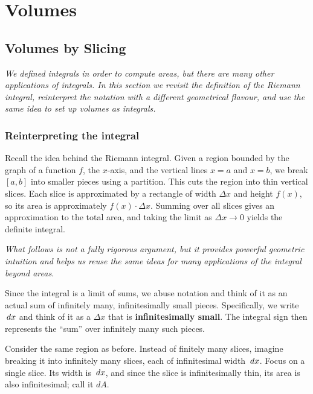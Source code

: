\chapter{Volumes}

\section{Volumes by Slicing}
\label{sec:10.1}

\textit{We defined integrals in order to compute areas, but there are many other applications of integrals.  In this section we revisit the definition of the Riemann integral, reinterpret the notation with a different geometrical flavour, and use the same idea to set up volumes as integrals.}

\subsection*{Reinterpreting the integral}

Recall the idea behind the Riemann integral.  Given a region bounded by the graph of a function $f$, the $x$-axis, and the vertical lines $x = a$ and $x = b$, we break $[a,b]$ into smaller pieces using a partition.  This cuts the region into thin vertical slices.  Each slice is approximated by a rectangle of width $\Delta x$ and height $f(x)$, so its area is approximately $f(x)\cdot\Delta x$.  Summing over all slices gives an approximation to the total area, and taking the limit as $\Delta x \to 0$ yields the definite integral.

\textit{What follows is not a fully rigorous argument, but it provides powerful geometric intuition and helps us reuse the same ideas for many applications of the integral beyond areas.}

Since the integral is a limit of sums, we abuse notation and think of it as an actual sum of infinitely many, infinitesimally small pieces.  Specifically, we write $\,dx$ and think of it as a $\Delta x$ that is \textbf{infinitesimally small}.  The integral sign then represents the ``sum'' over infinitely many such pieces.

Consider the same region as before.  Instead of finitely many slices, imagine breaking it into infinitely many slices, each of infinitesimal width $\,dx$.  Focus on a single slice.  Its width is $\,dx$, and since the slice is infinitesimally thin, its area is also infinitesimal; call it $dA$.

